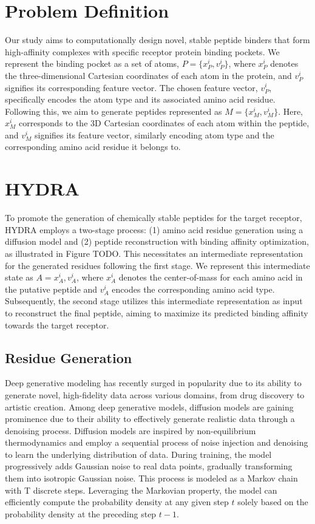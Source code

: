 \section{Problem Definition} 
Our study aims to computationally design novel, stable peptide binders that form high-affinity complexes with specific receptor protein binding pockets.
We represent the binding pocket as a set of atoms, $P = \{x_P^i, v_P^i\}$, where $x_P^i$ denotes the three-dimensional Cartesian coordinates of each atom in the protein, and $v_P^i$ signifies its corresponding feature vector. The chosen feature vector, $v_P^i$, specifically encodes the atom type and its associated amino acid residue. Following this, we aim to generate peptides represented as $M = \{x_M^i, v_M^i\}$. Here, $x_M^i$ corresponds to the 3D Cartesian coordinates of each atom within the peptide, and $v_M^i$ signifies its feature vector, similarly encoding atom type and the corresponding amino acid residue it belongs to.

\section{HYDRA}
To promote the generation of chemically stable peptides for the target receptor, HYDRA employs a two-stage process: (1) amino acid residue generation using a diffusion model and (2) peptide reconstruction with binding affinity optimization, as illustrated in Figure TODO. This necessitates an intermediate representation for the generated residues following the first stage. We represent this intermediate state as $A = {x_A^i, v_A^i}$, where $x_A^i$ denotes the center-of-mass for each amino acid in the putative peptide and $v_A^i$ encodes the corresponding amino acid type. Subsequently, the second stage utilizes this intermediate representation as input to reconstruct the final peptide, aiming to maximize its predicted binding affinity towards the target receptor.

\subsection{Residue Generation}
Deep generative modeling has recently surged in popularity due to its ability to generate novel, high-fidelity data across various domains, from drug discovery to artistic creation. Among deep generative models, diffusion models are gaining prominence due to their ability to effectively generate realistic data through a denoising process. Diffusion models are inspired by non-equilibrium thermodynamics \cite{sohl2015deep, ho2020denoising} and employ a sequential process of noise injection and denoising to learn the underlying distribution of data. During training, the model progressively adds Gaussian noise to real data points, gradually transforming them into isotropic Gaussian noise. This process is modeled as a Markov chain with T discrete steps. Leveraging the Markovian property, the model can efficiently compute the probability density at any given step $t$ solely based on the probability density at the preceding step $t-1$.

